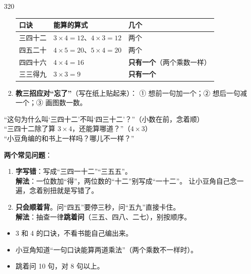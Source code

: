 \begin{lesson}{3}{20}
\begin{enumerate}
\begin{center}
\begin{tabular}{@{}lll@{}}
        \toprule
        \textbf{口诀} & \textbf{能算的算式} & \textbf{几个} \\
        \midrule
        三四十二 & $3\times4=12$、$4\times3=12$ & 两个 \\
        四五二十 & $4\times5=20$、$5\times4=20$ & 两个 \\
        四四十六 & $4\times4=16$ & \textbf{只有一个}（两个乘数一样）\\
        三三得九 & $3\times3=9$ & \textbf{只有一个} \\
        \bottomrule
        \end{tabular}
        \end{center}
  \item \textbf{教三招应对“忘了”}（写在纸上贴起来）：
        ① 想前一句加一个；② 想后一句减一个；③ 画图数一数。
\end{enumerate}

\begin{saybox}
“这句为什么叫‘三四十二’不叫‘四三十二’？”（小数在前，念着顺）\\
“三四十二除了算 $3\times4$，还能算哪道？”（$4\times3$）\\
“小豆角编的和书上一样吗？哪儿不一样？”
\end{saybox}

\begin{pitbox}
\textbf{两个常见问题}：
\begin{enumerate}[label=\arabic*、]
  \item \textbf{字写错}：写成“三四一十二”“三五五”。\\
\textbf{解法}：一位数加“得”，两位数的“十二”别写成“一十二”。
        让小豆角自己念一遍，念着别扭就是写错了。
  \item \textbf{只会顺着背}。问“四五”要停三秒，问“五九”直接卡住。\\
\textbf{解法}：抽查一律\textbf{跳着问}（三五、四八、二七），别按顺序。
\end{enumerate}
\end{pitbox}

\begin{passbox}
\begin{itemize}
  \item 3 和 4 的口诀，不看书能自己编出来。
  \item 小豆角知道“一句口诀能算两道乘法”（两个乘数不一样时）。
  \item 跳着问 10 句，对 8 句以上。
\end{itemize}
\end{passbox}
\end{lesson}

